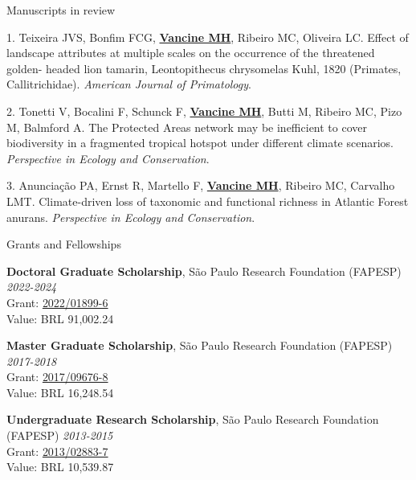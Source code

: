 \documentclass{resume}
\begin{document}

\begin{rSection}{Manuscripts in review }

1. Teixeira JVS, Bonfim FCG, \underline{\bf Vancine MH}, Ribeiro MC, Oliveira LC. Effect
of landscape attributes at multiple scales on the occurrence of the threatened golden-
headed lion tamarin, Leontopithecus chrysomelas Kuhl, 1820 (Primates, Callitrichidae).
{\it American Journal of Primatology}.

2. Tonetti V, Bocalini F, Schunck F, \underline{\bf Vancine MH}, Butti M, Ribeiro MC, Pizo M,
Balmford A. The Protected Areas network may be inefficient to cover biodiversity in a
fragmented tropical hotspot under different climate scenarios. {\it Perspective in Ecology and
Conservation}.

3. Anunciação PA, Ernst R, Martello F, \underline{\bf Vancine MH}, Ribeiro MC, Carvalho LMT. Climate-driven loss of taxonomic and functional richness in Atlantic Forest anurans. {\it Perspective in Ecology and Conservation}.

\end{rSection}


\begin{rSection}{Grants and Fellowships} 

{\bf Doctoral Graduate Scholarship}{, São Paulo Research Foundation (FAPESP)
} \hfill{\em 2022-2024} \\ 
Grant: \href{https://bv.fapesp.br/en/bolsas/203713/landscape-structure-as-a-predictor-of-taxonomic-and-functional-diversity-of-amphibians-in-the-atlant/}{2022/01899-6} \\Value: BRL 91,002.24

{\bf Master Graduate Scholarship}{, São Paulo Research Foundation (FAPESP)
} \hfill{\em 2017-2018} \\ 
Grant: \href{https://bv.fapesp.br/en/bolsas/172826/effect-of-landscape-modifications-and-climate-changes-on-the-persistence-of-amphibians-in-the-atlant/}{2017/09676-8} \\ Value: BRL 16,248.54

{\bf Undergraduate Research Scholarship}{, São Paulo Research Foundation (FAPESP)
} \hfill{\em 2013-2015} \\ 
Grant: \href{https://bv.fapesp.br/en/bolsas/142421/effect-of-fragmentation-on-the-persistence-of-anuran-amphibians-amphibia-anura-within-the-atlanti/}{2013/02883-7} \\ Value: BRL 10,539.87

\end{rSection}
\end{document}
